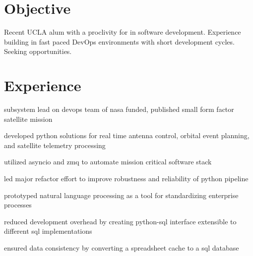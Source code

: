 %
\begin{minipage}[t]{0.78\textwidth} %

\section{Objective}
\begin{minipage}[t]{0.90\textwidth}
Recent UCLA alum with a proclivity for  in software development. Experience building  in fast paced DevOps environments with short development cycles. 
Seeking  opportunities.
\end{minipage}

    

\section{Experience}

\vspace{\topsep}
\begin{tightitemize}
    \item subsystem lead on devops team of nasa funded, published small form factor satellite mission
    \item developed python solutions for real time antenna control, orbital event planning, and satellite telemetry processing
    \item utilized asyncio and zmq to automate mission critical software stack
    \item led major refactor effort to improve robustness and reliability of python pipeline
\end{tightitemize}
\vspace{\topsep}


\begin{tightitemize}
    \item prototyped natural language processing as a tool for standardizing enterprise processes
    \item reduced development overhead by creating python-sql interface extensible to different sql implementations
    \item ensured data consistency by converting a spreadsheet cache to a sql database
\end{tightitemize}
\vspace{\topsep}



\end{minipage}
